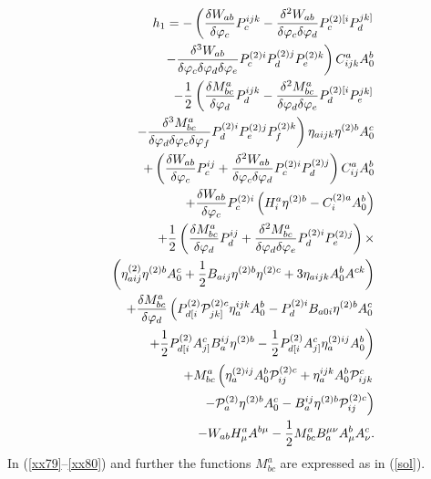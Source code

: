 \documentclass[a4paper,12pt]{article}
\begin{document}
\begin{eqnarray}
&&h_{1}=-\left( \frac{\delta W_{ab}}{\delta \varphi _{c}}P_{c}^{ijk}-\frac{%
\delta ^{2}W_{ab}}{\delta \varphi _{c}\delta \varphi _{d}}%
P_{c}^{(2)[i}P_{d}^{jk]}\right.  \nonumber \\
&&\left. -\frac{\delta ^{3}W_{ab}}{\delta \varphi _{c}\delta \varphi
_{d}\delta \varphi _{e}}P_{c}^{(2)i}P_{d}^{(2)j}P_{e}^{(2)k}\right)
C_{ijk}^{a}A_{0}^{b}  \nonumber \\
&&-\frac{1}{2}\left( \frac{\delta M_{bc}^{a}}{\delta \varphi _{d}}%
P_{d}^{ijk}-\frac{\delta ^{2}M_{bc}^{a}}{\delta \varphi _{d}\delta \varphi
_{e}}P_{d}^{(2)[i}P_{e}^{jk]}\right.  \nonumber \\
&&\left. -\frac{\delta ^{3}M_{bc}^{a}}{\delta \varphi _{d}\delta \varphi
_{e}\delta \varphi _{f}}P_{d}^{(2)i}P_{e}^{(2)j}P_{f}^{(2)k}\right) \eta
_{aijk}\eta ^{(2)b}A_{0}^{c}  \nonumber \\
&&+\left( \frac{\delta W_{ab}}{\delta \varphi _{c}}P_{c}^{ij}+\frac{\delta
^{2}W_{ab}}{\delta \varphi _{c}\delta \varphi _{d}}P_{c}^{(2)i}P_{d}^{(2)j}%
\right) C_{ij}^{a}A_{0}^{b}  \nonumber \\
&&+\frac{\delta W_{ab}}{\delta \varphi _{c}}P_{c}^{(2)i}\left( H_{i}^{a}\eta
^{(2)b}-C_{i}^{(2)a}A_{0}^{b}\right)  \nonumber \\
&&+\frac{1}{2}\left( \frac{\delta M_{bc}^{a}}{\delta \varphi _{d}}P_{d}^{ij}+%
\frac{\delta ^{2}M_{bc}^{a}}{\delta \varphi _{d}\delta \varphi _{e}}%
P_{d}^{(2)i}P_{e}^{(2)j}\right) \times  \nonumber \\
&&\left( \eta _{aij}^{(2)}\eta ^{(2)b}A_{0}^{c}+\frac{1}{2}B_{aij}\eta
^{(2)b}\eta ^{(2)c}+3\eta _{aijk}A_{0}^{b}A^{ck}\right)  \nonumber \\
&&+\frac{\delta M_{bc}^{a}}{\delta \varphi _{d}}\left( P_{d[i}^{(2)}\mathcal{%
P}_{jk]}^{(2)c}\eta _{a}^{ijk}A_{0}^{b}-P_{d}^{(2)i}B_{a0i}\eta
^{(2)b}A_{0}^{c}\right.  \nonumber \\
&&\left. +\frac{1}{2}P_{d[i}^{(2)}A_{j]}^{c}B_{a}^{ij}\eta ^{(2)b}-\frac{1}{2%
}P_{d[i}^{(2)}A_{j]}^{c}\eta _{a}^{(2)ij}A_{0}^{b}\right)  \nonumber \\
&&+M_{bc}^{a}\left( \eta _{a}^{(2)ij}A_{0}^{b}\mathcal{P}_{ij}^{(2)c}+\eta
_{a}^{ijk}A_{0}^{b}\mathcal{P}_{ijk}^{c}\right.  \nonumber \\
&&\left. -\mathcal{P}_{a}^{(2)}\eta ^{(2)b}A_{0}^{c}-B_{a}^{ij}\eta ^{(2)b}%
\mathcal{P}_{ij}^{(2)c}\right)  \nonumber \\
&&-W_{ab}H_{\mu }^{a}A^{b\mu }-\frac{1}{2}M_{bc}^{a}B_{a}^{\mu \nu }A_{\mu
}^{b}A_{\nu }^{c}.  \label{xx80}
\end{eqnarray}
In (\ref{xx79}--\ref{xx80}) and further the functions $M_{bc}^{a}$ are
expressed as in (\ref{sol}).
\end{document}
